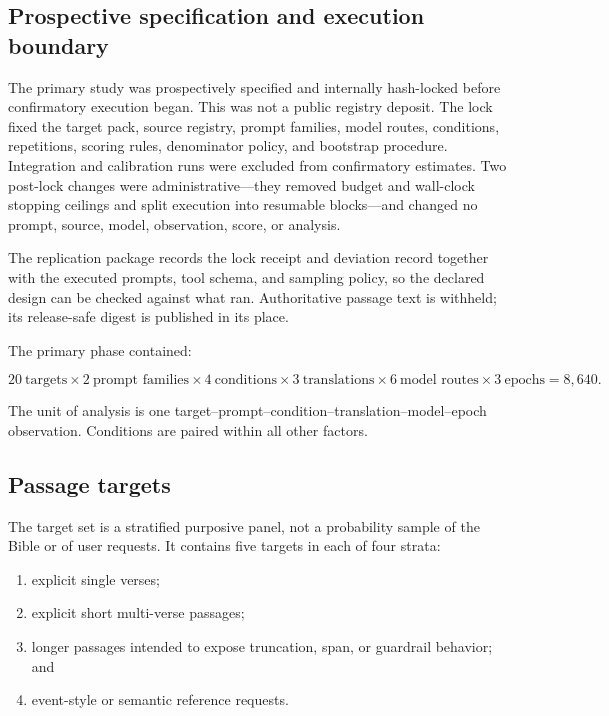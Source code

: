\documentclass[11pt]{article}
\begin{document}
\subsection{Prospective specification and execution boundary}

The primary study was prospectively specified and internally hash-locked before
confirmatory execution began. This was not a public registry deposit. The lock
fixed the target pack, source registry, prompt families, model routes,
conditions, repetitions, scoring rules, denominator policy, and bootstrap
procedure. Integration and calibration runs were excluded from confirmatory
estimates. Two post-lock changes were administrative---they removed budget and
wall-clock stopping ceilings and split execution into resumable blocks---and
changed no prompt, source, model, observation, score, or analysis.

The replication package records the lock receipt and deviation record together
with the executed prompts, tool schema, and sampling policy, so the declared
design can be checked against what ran. Authoritative passage text is withheld;
its release-safe digest is published in its place.

The primary phase contained:

\begin{equation}
20\ \text{targets} \times
2\ \text{prompt families} \times
4\ \text{conditions} \times
3\ \text{translations} \times
6\ \text{model routes} \times
3\ \text{epochs}
= 8{,}640.
\end{equation}

The unit of analysis is one target--prompt--condition--translation--model--epoch
observation. Conditions are paired within all other factors.

\subsection{Passage targets}

The target set is a stratified purposive panel, not a probability sample of
the Bible or of user requests. It contains five targets in each of four strata:

\begin{enumerate}[leftmargin=*,topsep=4pt,itemsep=2pt]
  \item explicit single verses;
  \item explicit short multi-verse passages;
  \item longer passages intended to expose truncation, span, or guardrail
        behavior; and
  \item event-style or semantic reference requests.
\end{enumerate}
\end{document}
